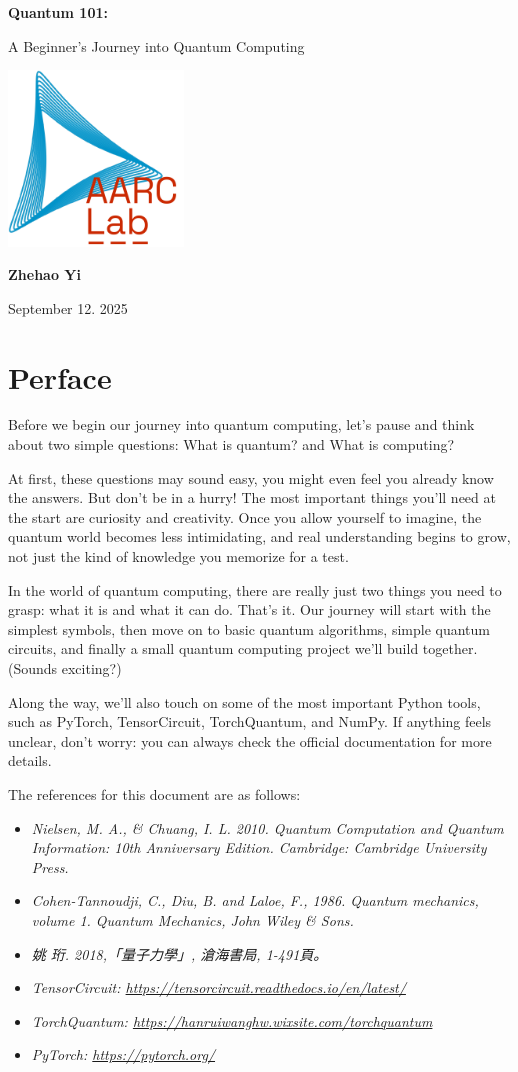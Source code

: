 \documentclass[12pt,oneside]{book}
\newcommand{\makeModernCover}{
\begin{titlepage}

  \vspace*{3cm}
  \begin{center}
    {\Huge\bfseries Quantum 101:\par}
    \vspace{0.8cm}
    {\large A Beginner's Journey into Quantum Computing\par} %

    \vspace{2.5cm}
    \includegraphics[width=0.35\textwidth]{LogoWithText.pdf} %

    \vspace{2.5cm}
    {\Large \textbf{Zhehao Yi}\par}
    \vspace{0.2cm}
    {\large September 12. 2025\par}
  \end{center}
  \vfill
\end{titlepage}
}
\begin{document}
\makeModernCover
\frontmatter
\tableofcontents
\mainmatter

\chapter*{Perface}
Before we begin our journey into quantum computing, let's pause and think about two simple questions: What is quantum? and What is computing?

At first, these questions may sound easy, you might even feel you already know the answers. But don't be in a hurry! The most important things you'll need at the start are curiosity and creativity. Once you allow yourself to imagine, the quantum world becomes less intimidating, and real understanding begins to grow, not just the kind of knowledge you memorize for a test.

In the world of quantum computing, there are really just two things you need to grasp: what it is and what it can do. That's it. Our journey will start with the simplest symbols, then move on to basic quantum algorithms, simple quantum circuits, and finally a small quantum computing project we'll build together. (Sounds exciting?)

Along the way, we'll also touch on some of the most important Python tools, such as PyTorch, TensorCircuit, TorchQuantum, and NumPy. If anything feels unclear, don't worry: you can always check the official documentation for more details.

The references for this document are as follows:
\begin{referencebox}[Reference]
  \begin{itemize}
    \item \textit{Nielsen, M. A., \& Chuang, I. L. 2010. Quantum Computation and Quantum Information: 10th Anniversary Edition. Cambridge: Cambridge University Press.}
    \item \textit{Cohen-Tannoudji, C., Diu, B. and Laloe, F., 1986. Quantum mechanics, volume 1. Quantum Mechanics, John Wiley \& Sons.}
    \item \textit{姚 珩. 2018,「量子力學」, 滄海書局, 1-491頁。}
    \item \textit{TensorCircuit: \href{https://tensorcircuit.readthedocs.io/en/latest/}{https://tensorcircuit.readthedocs.io/en/latest/}}
    \item \textit{TorchQuantum: \href{https://hanruiwanghw.wixsite.com/torchquantum}{https://hanruiwanghw.wixsite.com/torchquantum}}
    \item \textit{PyTorch: \href{https://pytorch.org/}{https://pytorch.org/}}
  \end{itemize}
\end{referencebox}
\end{document}
